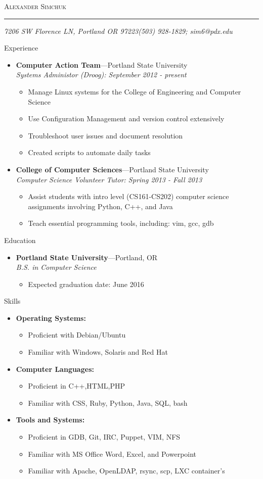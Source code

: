 \documentclass[11pt,oneside]{article}
\makeatletter
\newcommand{\name}{Alexander Simchuk}
\newcommand{\addr}{7206 SW Florence LN, Portland OR 97223}
\newcommand{\phone}{(503) 928-1829}
\newcommand{\email}{sim6@pdx.edu}
\newcommand{\bigname}[1]{
	\begin{center}\fontfamily{phv}\selectfont\Huge\scshape#1\end{center}
}
\newenvironment{ressection}[1]{
	\vspace{4pt}
	{\fontfamily{phv}\selectfont\Large#1}
	\begin{itemize}
	\vspace{3pt}
}{
	\end{itemize}
}
\newcommand{\resitem}[1]{
	\vspace{-4pt}
	\item \begin{flushleft} #1 \end{flushleft}
}
\newcommand{\ressubitem}[1]{
	\vspace{-1pt}
	\item \begin{flushleft} #1 \end{flushleft}
}
\newcommand{\resbigitem}[3]{
	\vspace{-5pt}
	\item
	\textbf{#1}---#2 \\
	\textit{#3}
}
\newenvironment{ressubsec}[3]{
	\resbigitem{#1}{#2}{#3}
	\vspace{-2pt}
	\begin{itemize}
}{
	\end{itemize}
}
\newenvironment{reslist}[1]{
	\resitem{\textbf{#1}}
	\vspace{-5pt}
	\begin{itemize}
}{
	\end{itemize}
}
\makeatother
\begin{document}
 \selectfont
\bigname{\name}
\vspace{-8pt} \rule{\textwidth}{1pt}
\vspace{-1pt} {\small\itshape \addr \hfill \phone; \email}
\vspace{8 pt}


\begin{ressection}{Experience}
    \begin{ressubsec}{Computer Action Team}{Portland State University}{Systems Administor (Droog): September 2012 - present}
		\ressubitem{Manage Linux systems for the College of Engineering and Computer Science}
		\ressubitem{Use Configuration Management and version control extensively}
		\ressubitem{Troubleshoot user issues and document resolution}
		\ressubitem{Created scripts to automate daily tasks}
	\end{ressubsec}
	\begin{ressubsec}{College of Computer Sciences}{Portland State University}{Computer Science Volunteer Tutor: Spring 2013 - Fall 2013}
        \ressubitem{Assist students with intro level (CS161-CS202) computer science assignments involving Python, C++, and Java}
        \ressubitem{Teach essential programming tools, including: vim, gcc, gdb}
	\end{ressubsec}
\end{ressection}


\begin{ressection}{Education}
    \begin{ressubsec}{Portland State University}{Portland, OR}{B.S. in Computer Science}
		\ressubitem{Expected graduation date: June 2016}
	\end{ressubsec}
\end{ressection}


\begin{ressection}{Skills}
    \begin{reslist}{Operating Systems:}
        \ressubitem{Proficient with Debian/Ubuntu}
        \ressubitem{Familiar with Windows, Solaris and Red Hat}
	\end{reslist}
	\begin{reslist}{Computer Languages:}
        \ressubitem{Proficient in C++,HTML,PHP}
        \ressubitem{Familiar with CSS, Ruby, Python, Java, SQL, bash}
	\end{reslist}
	\begin{reslist}{Tools and Systems:}
        \ressubitem{Proficient in GDB, Git, IRC, Puppet, VIM, NFS}
	\ressubitem{Familiar with MS Office Word, Excel, and Powerpoint}
        \ressubitem{Familiar with Apache, OpenLDAP, rsync, scp, LXC container's}
	\end{reslist}
\end{ressection}
\end{document}
